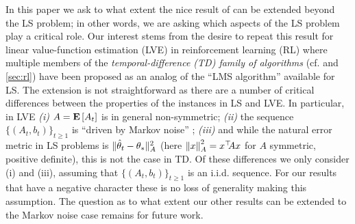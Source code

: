 In this paper we ask to what extent the nice result 
of \citet{bach-moulines} can be extended beyond the LS problem;
in other words, we are asking which aspects of the LS problem play a critical role. 
Our interest stems from the desire to repeat this result for
linear value-function estimation (LVE) in reinforcement learning (RL) where
multiple members of the
\emph{temporal-difference (TD) family of algorithms} 
(cf. \cite{sutton,gtd,gtd2,gtdmp} and \cref{sec:rl})
have been proposed as an analog of the ``LMS algorithm'' available for LS.
The extension is not straightforward as there are a number of critical differences
between the properties of the instances in LS and LVE.
In particular,  in LVE
{\em (i)}  $A=\mathbf{E}\left[A_t\right]$ is in general non-symmetric;
{\em (ii)} the sequence  $\{(A_t,b_t)\}_{t\ge 1}$ is ``driven by Markov noise'' \cite{tsivan95,tsivan97};
{\em (iii)} and while the natural error metric in LS problems is $\| \hat{\theta}_t-\theta_*\|_{A}^2$
(here $\left\| x\right\|_A^2 = x^\top\!\!A x$ for $A$ symmetric, positive definite), 
this is not the case in TD.
Of these differences we only consider (i) and (iii), assuming that $\{(A_t,b_t)\}_{t\ge 1}$ is an i.i.d. sequence. For our results that have a negative character these is no loss of generality
making this assumption. 
The question as to what extent our other results can be extended to the Markov noise
case remains for future work. 

\iffalse
\if0
In particular, the convergence rates can degrade, or they may depend on potentially unbounded problem dependent constants \cite{bach-moulines}. Diminishing stepsizes such as $\alpha_t=\frac{c_0}{t+c}$, with problem instance specific tuning of the constants $c>0,c_0>0$ have been used in practice \cite{gtd2,gtdmp,konda-tsitsiklis}. 
An alternate idea, which we call the constant stepsize averaged LSA (CALSA) is to run \eqref{eq:lsaintro} by choosing $\alpha_t=\alpha>0$ $\forall t> 0$ with some $\alpha>0$, and output the average $\thh_t\eqdef\frac{1}{t+1}\sum_{s=0}^t \theta_s$. Thus, in CALSA, $\theta_t$ is an internal variable and $\thh_t$ is the output of the algorithm. The idea is that the constant stepsize leads to faster forgetting of initial conditions, while the averaging on the top reduces noise. This idea goes back to  \citet{ruppert} and \citet{polyak-judisky} who proposed it in the context of stochastic approximation that LSA is a special case of.   
\fi

